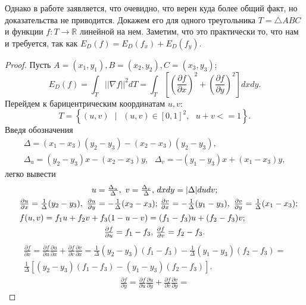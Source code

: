 Однако в работе \cite{Pinkall93} заявляется, что очевидно, что верен куда более общий факт, но доказательства не
приводится. Докажем его для одного треугольника $T = \triangle ABC$ и функции $f: T \to \mathbb{R}$ линейной
на нем. Заметим, что это практически то, что нам и требуется, так как $E_D(f) = E_D(f_x) + E_D(f_y)$. 
\begin{proof}
Пусть $A=(x_1, y_1), B=(x_2, y_2), C=(x_3, y_3)$; $$\textstyle E_D(f) = \int_{T}{||\nabla{f}||^2 dT} = 
        \int_{T}{\left[\left(\frac{\partial f}{\partial x}\right)^2 + 
                       \left(\frac{\partial f}{\partial y}\right)^2 \right] dx dy}.$$ 
Перейдем к барицентрическим координатам $u, v$: 
$$\textstyle T = \left\{(u, v)\mbox{ } | \mbox{ } (u, v) \in \left[0, 1 \right]^2 ,\mbox{ } u + v <= 1 \right\}.$$ 
Введя обозначения 
\begin{multline*} \Delta = (x_1 - x_3) (y_2 - y_3) - (x_2 - x_3) (y_2 - y_3), \\ 
\Delta_u = (y_2 - y_3) x - (x_2 - x_3) y, \mbox{ } \Delta_v = -(y_1 - y_3) x + (x_1 - x_3) y, 
\end{multline*}
легко вывести
\begin{multline*} 
\textstyle u = \frac{\Delta_u}{\Delta}, \mbox{ } v = \frac{\Delta_v}{\Delta} \mbox{, } dxdy = |\Delta| dudv; \\
\textstyle \shoveleft{ \frac{\partial u}{\partial x} = \frac{1}{\Delta}(y_2 - y_3),    \mbox{ } \frac{\partial u}{\partial y} = -\frac{1}{\Delta}(x_2 - x_3) \mbox{; }
            \frac{\partial v}{\partial x} = -\frac{1}{\Delta}(y_1 - y_3),   \mbox{ } \frac{\partial v}{\partial y} =  \frac{1}{\Delta}(x_1 - x_3); } \\
\textstyle \shoveleft{f(u, v) = f_1 u + f_2 v + f_3(1-u-v) = (f_1 - f_3) u + (f_2 - f_3) v;} \\
\textstyle \frac{\partial f}{\partial u} = f_1 - f_3 \mbox{, } \frac{\partial f}{\partial v} = f_2 - f_3. 
\end{multline*} 
\begin{eqnarray*}
\textstyle \frac{\partial f}{\partial x} = \frac{\partial f}{\partial u} \frac{\partial u}{\partial x} + \frac{\partial f}{\partial v} \frac{\partial v}{\partial x} = 
\frac{1}{\Delta}(y_2 - y_3)(f_1 - f_3) - \frac{1}{\Delta}(y_1 - y_3)(f_2 - f_3) = \\
\textstyle             \frac{1}{\Delta}\left[(y_2 - y_3)(f_1 - f_3) - (y_1 - y_3)(f_2 - f_3)\right]. 
\end{eqnarray*}
\begin{eqnarray*}
\textstyle         \frac{\partial f}{\partial y} = \frac{\partial f}{\partial u} \frac{\partial u}{\partial y} + \frac{\partial f}{\partial v} \frac{\partial v}{\partial y} = 

\end{eqnarray*}
\end{proof}
